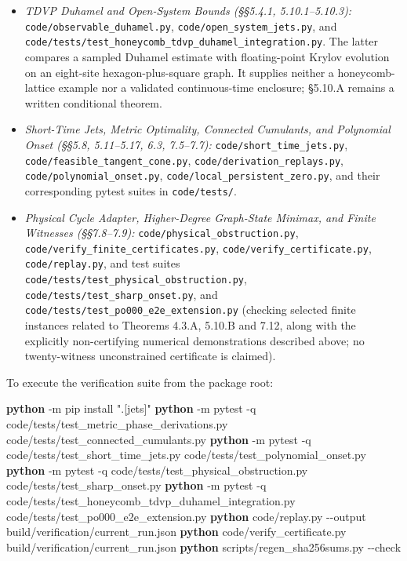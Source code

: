\documentclass[
  11pt,
]{article}
\newenvironment{Shaded}{\begin{snugshade}}{\end{snugshade}}
\newcommand{\AttributeTok}[1]{\textcolor[rgb]{0.00,0.34,0.68}{#1}}
\newcommand{\ExtensionTok}[1]{\textcolor[rgb]{0.00,0.58,1.00}{\textbf{#1}}}
\newcommand{\NormalTok}[1]{\textcolor[rgb]{0.12,0.11,0.11}{#1}}
\newcommand{\StringTok}[1]{\textcolor[rgb]{0.75,0.01,0.01}{#1}}
\providecommand{\tightlist}{%
  \setlength{\itemsep}{0pt}\setlength{\parskip}{0pt}}
\providecommand{\tightlist}{%
  \setlength{\itemsep}{0pt}\setlength{\parskip}{0pt}}
\begin{document}
\begin{itemize}
  \begin{itemize}
  \tightlist
  \item
    \emph{TDVP Duhamel and Open-System Bounds (§§5.4.1, 5.10.1--5.10.3):} \texttt{code/observable\_duhamel.py}, \texttt{code/open\_system\_jets.py}, and \texttt{code/tests/test\_honeycomb\_tdvp\_duhamel\_integration.py}. The latter compares a sampled Duhamel estimate with floating-point Krylov evolution on an eight-site hexagon-plus-square graph. It supplies neither a honeycomb-lattice example nor a validated continuous-time enclosure; §5.10.A remains a written conditional theorem.
  \item
    \emph{Short-Time Jets, Metric Optimality, Connected Cumulants, and Polynomial Onset (§§5.8, 5.11--5.17, 6.3, 7.5--7.7):} \texttt{code/short\_time\_jets.py}, \texttt{code/feasible\_tangent\_cone.py}, \texttt{code/derivation\_replays.py}, \texttt{code/polynomial\_onset.py}, \texttt{code/local\_persistent\_zero.py}, and their corresponding pytest suites in \texttt{code/tests/}.
  \item
    \emph{Physical Cycle Adapter, Higher-Degree Graph-State Minimax, and Finite Witnesses (§§7.8--7.9):} \texttt{code/physical\_obstruction.py}, \texttt{code/verify\_finite\_certificates.py}, \texttt{code/verify\_certificate.py}, \texttt{code/replay.py}, and test suites \texttt{code/tests/test\_physical\_obstruction.py}, \texttt{code/tests/test\_sharp\_onset.py}, and \texttt{code/tests/test\_po000\_e2e\_extension.py} (checking selected finite instances related to Theorems 4.3.A, 5.10.B and 7.12, along with the explicitly non-certifying numerical demonstrations described above; no twenty-witness unconstrained certificate is claimed).
  \end{itemize}
\end{itemize}

To execute the verification suite from the package root:

\begin{Shaded}
\begin{Highlighting}[]
\ExtensionTok{python} \AttributeTok{{-}m}\NormalTok{ pip install }\StringTok{".[jets]"}
\ExtensionTok{python} \AttributeTok{{-}m}\NormalTok{ pytest }\AttributeTok{{-}q}\NormalTok{ code/tests/test\_metric\_phase\_derivations.py code/tests/test\_connected\_cumulants.py}
\ExtensionTok{python} \AttributeTok{{-}m}\NormalTok{ pytest }\AttributeTok{{-}q}\NormalTok{ code/tests/test\_short\_time\_jets.py code/tests/test\_polynomial\_onset.py}
\ExtensionTok{python} \AttributeTok{{-}m}\NormalTok{ pytest }\AttributeTok{{-}q}\NormalTok{ code/tests/test\_physical\_obstruction.py code/tests/test\_sharp\_onset.py}
\ExtensionTok{python} \AttributeTok{{-}m}\NormalTok{ pytest }\AttributeTok{{-}q}\NormalTok{ code/tests/test\_honeycomb\_tdvp\_duhamel\_integration.py code/tests/test\_po000\_e2e\_extension.py}
\ExtensionTok{python}\NormalTok{ code/replay.py }\AttributeTok{{-}{-}output}\NormalTok{ build/verification/current\_run.json}
\ExtensionTok{python}\NormalTok{ code/verify\_certificate.py build/verification/current\_run.json}
\ExtensionTok{python}\NormalTok{ scripts/regen\_sha256sums.py }\AttributeTok{{-}{-}check}
\end{Highlighting}
\end{Shaded}
\end{document}
